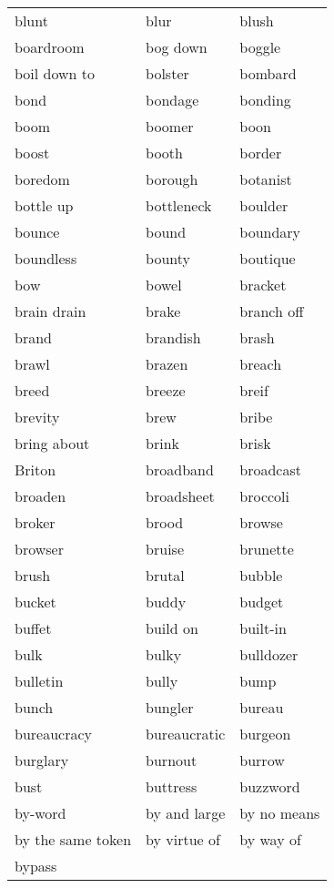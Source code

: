 \documentclass{minimal}
\begin{document}
\begin{longtable}{p{2.8cm}p{2.8cm}p{2.8cm}}
blunt & blur & blush \\
boardroom & bog down & boggle \\
boil down to & bolster & bombard \\
bond & bondage & bonding \\
boom & boomer & boon \\
boost & booth & border \\
boredom & borough & botanist \\
bottle up & bottleneck & boulder \\
bounce & bound & boundary \\
boundless & bounty & boutique \\
bow & bowel & bracket \\
brain drain & brake & branch off \\
brand & brandish & brash \\
brawl & brazen & breach \\
breed & breeze & breif \\
brevity & brew & bribe \\
bring about & brink & brisk \\
Briton & broadband & broadcast \\
broaden & broadsheet & broccoli \\
broker & brood & browse \\
browser & bruise & brunette \\
brush & brutal & bubble \\
bucket & buddy & budget \\
buffet & build on & built-in \\
bulk & bulky & bulldozer \\
bulletin & bully & bump \\
bunch & bungler & bureau \\
bureaucracy & bureaucratic & burgeon \\
burglary & burnout & burrow \\
bust & buttress & buzzword \\
by-word & by and large & by no means \\
by the same token & by virtue of & by way of \\
bypass
\end{longtable}
\end{document}
